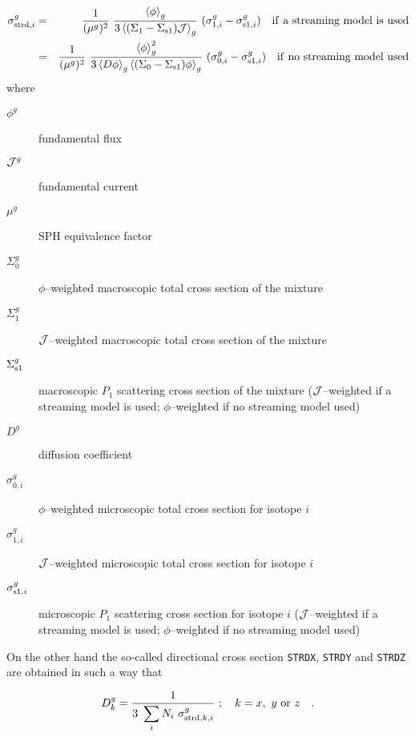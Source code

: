 \begin{eqnarray}
\sigma_{{\rm strd},i}^g&=&{1\over (\mu^g)^2} \ {\left<\phi \right>_g \over 3
\left<(\Sigma_1-\Sigma_{\rm s1}){\cal J}\right>_g} \ (\sigma_{1,i}^g-\sigma_{{\rm
s1},i}^g) \ \
\ {\rm if \ a \ streaming \ model \ is \ used} \\
&=&{1\over (\mu^g)^2} \ {\left<\phi \right>_g^2 \over 3 \left< D \phi \right>_g
\left<(\Sigma_0-\Sigma_{\rm s1})\phi\right>_g} \ (\sigma_{0,i}^g-\sigma_{{\rm
s1},i}^g) \ \
\ {\rm if \ no \ streaming \ model \ used}
\end{eqnarray}
\noindent where

\begin{description}
\item [$\phi^g$] fundamental flux
\item [${\cal J}^g$] fundamental current
\item [$\mu^g$] SPH equivalence factor
\item [$\Sigma_0^g$] $\phi$--weighted macroscopic total cross section of the
mixture
\item [$\Sigma_1^g$] ${\cal J}$--weighted macroscopic total cross section of the
mixture
\item [$\Sigma_{\rm s1}^g$] macroscopic $P_1$ scattering cross section of the
mixture (${\cal J}$--weighted
if a streaming model is used; $\phi$--weighted if no streaming model used)
\item [$D^g$] diffusion coefficient
\item [$\sigma_{0,i}^g$] $\phi$--weighted microscopic total cross section for
isotope $i$
\item [$\sigma_{1,i}^g$] ${\cal J}$--weighted microscopic total cross section for
isotope $i$
\item [$\sigma_{{\rm s1}.i}^g$] microscopic $P_1$ scattering cross section for
isotope $i$ (${\cal J}$--weighted
if a streaming model is used; $\phi$--weighted if no streaming model used)
\end{description}

\vskip 0.2cm

On the other hand the so-called directional cross
section {\tt STRDX}, {\tt STRDY}
and {\tt STRD\blank{1}Z} are obtained in such a way that

\begin{equation}
D_k^g={\displaystyle 1\over\displaystyle 3 \ \sum_i N_i \ \sigma_{{\rm strd},k,i}^g}
\ ; \ \ \ k=x,\ y \ {\rm or} \ z \ \ \ .
\end{equation}

